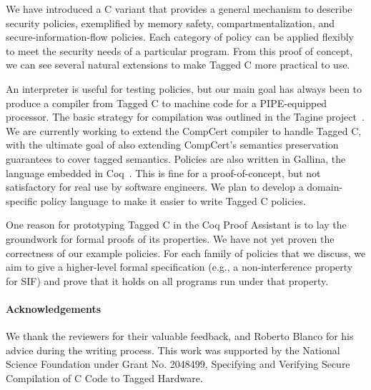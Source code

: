 We have introduced a C variant that provides a general mechanism to describe security
policies, exemplified by memory safety, compartmentalization, and secure-information-flow
policies. Each category of policy can be applied flexibly to meet the security needs of
a particular program. From this proof of concept, we can see several natural extensions
to make Tagged C more practical to use.

An interpreter is useful for testing policies, but our main goal has always been to
produce a compiler from Tagged C to machine code for a PIPE-equipped processor.
The basic strategy for compilation was outlined in the Tagine project~\cite{Chhak21:Tagine}.
We are currently working to extend the CompCert compiler to handle Tagged C, with the ultimate
goal of also extending CompCert's semantics preservation guarantees to cover tagged semantics.
Policies are also written in Gallina, the language embedded in Coq~\cite{coq}. This is fine for a
proof-of-concept, but not satisfactory for real use by software engineers.
We plan to develop a domain-specific policy language to make it easier to write Tagged C policies.

One reason for prototyping Tagged C in the Coq Proof Assistant is to lay the groundwork
for formal proofs of its properties. We have not yet proven the correctness of our example
policies. For each family of policies that we discuss, we aim to give a higher-level formal
specification (e.g., a non-interference property for SIF) and prove that it holds on all
programs run under that property.

\paragraph{Acknowledgements}

We thank the reviewers for their valuable feedback, and Roberto Blanco for his advice during
the writing process. This work was supported by the National Science Foundation under
Grant No. 2048499, Specifying and Verifying Secure Compilation of C Code to Tagged Hardware.
